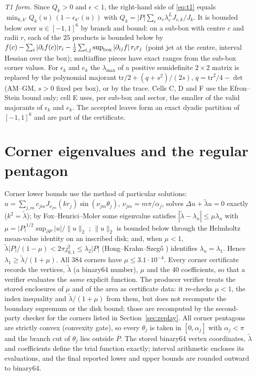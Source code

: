 \documentclass[11pt]{article}
\theoremstyle{remark}
\begin{document}
\emph{T1 form.} Since $Q_k>0$ and $\epsilon<1$, the right-hand side of \eqref{eq:t1} equals
$\min_{k,k'}Q_k(u)\,(1-\epsilon_{k'}(u))$ with $Q_k=|P|\sum_c\alpha_c\lambda^L_cJ_{c,k}/J_k$. It is bounded below over
$u\in[-1,1]^6$ by branch and bound: on a sub-box with centre $c$ and radii $r$, each of the $25$ products is bounded below
by $f(c)-\sum_i|\partial_if(c)|r_i-\frac12\sum_{i,j}\sup_{\rm box}|\partial_{ij}f|\,r_ir_j$ (point jet at the centre,
interval Hessian over the box); multiaffine pieces have exact ranges from the sub-box corner values. For $\epsilon_k$ and
$e_k$ the $\lambda_{\max}$ of a positive semidefinite $2\times2$ matrix is replaced by the polynomial majorant
$\mathrm{tr}/2+(q+s^2)/(2s)$, $q=\mathrm{tr}^2/4-\det$ (AM--GM, $s>0$ fixed per box), or by the trace. Cells C, D and F
use the Efron--Stein bound only; cell E uses, per sub-box and sector, the smaller of the valid majorants of $\epsilon_k$
and $e_k$. The accepted leaves form an exact dyadic partition of $[-1,1]^6$ and are part of the certificate.

\section{Corner eigenvalues and the regular pentagon}
Corner lower bounds use the method of particular solutions: $u=\sum_{j,m}c_{jm}J_{\nu_{jm}}(kr_j)\sin(\nu_{jm}\theta_j)$,
$\nu_{jm}=m\pi/\alpha_j$, solves $\Delta u+\tilde\lambda u=0$ exactly ($k^2=\tilde\lambda$); by Fox--Henrici--Moler some
eigenvalue satisfies $|\tilde\lambda-\lambda_n|\le\mu\lambda_n$ with $\mu=|P|^{1/2}\sup_{\partial P}|u|/\|u\|_2$
\cite{fhm,mp}; $\|u\|_2$ is bounded below through the Helmholtz mean-value identity on an inscribed disk; and, when
$\mu<1$, $\tilde\lambda|P|/(1-\mu)<2\pi j_{0,1}^2\le\lambda_2|P|$ (Hong--Krahn--Szeg\H{o} \cite{krahn,hong,henrot}) identifies $\lambda_n=\lambda_1$.
Hence $\lambda_1\ge\tilde\lambda/(1+\mu)$. All $384$ corners have $\mu\le3.1\cdot10^{-4}$. Every corner certificate
records the vertices, $\tilde\lambda$ (a binary64 number), $\mu$ and the $40$ coefficients, so that a verifier evaluates
the \emph{same} explicit function. The producer verifier treats the stored enclosures of $\mu$ and of the area as
certificate data: it re-checks $\mu<1$, the index inequality and $\tilde\lambda/(1+\mu)$ from them, but does not
recompute the boundary supremum or the disk bound; those are recomputed by the second-party checker for the corners
listed in Section~\ref{sec:replay}. All corner pentagons are strictly convex (convexity gate), so every $\theta_j$ is
taken in $[0,\alpha_j]$ with $\alpha_j<\pi$ and the branch cut of $\theta_j$ lies outside $\overline P$. The stored
binary64 vertex coordinates, $\tilde\lambda$ and coefficients define the trial function exactly; interval arithmetic
encloses its evaluations, and the final reported lower and upper bounds are rounded outward to binary64.
\end{document}

